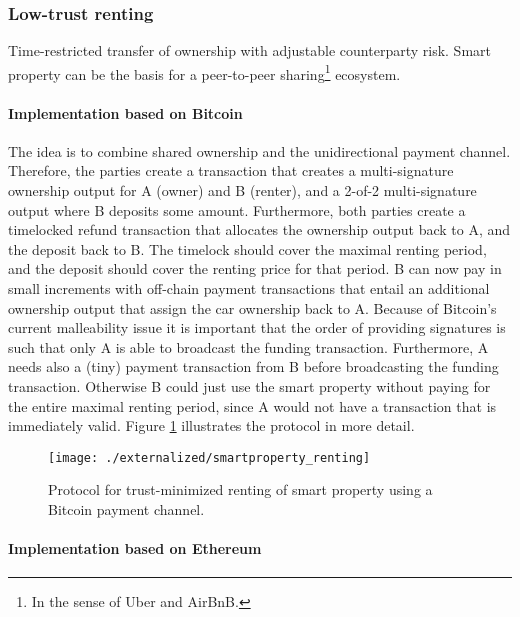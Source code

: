 \subsubsection{Low-trust renting}

Time-restricted transfer of ownership with adjustable counterparty risk. Smart property can be the basis for a peer-to-peer sharing\footnote{In the sense of Uber and AirBnB.} ecosystem. 

\paragraph{Implementation based on Bitcoin}

The idea is to combine shared ownership and the unidirectional payment channel. Therefore, the parties create a transaction that creates a multi-signature ownership output for A (owner) and B (renter), and a 2-of-2 multi-signature output where B deposits some amount. Furthermore, both parties create a timelocked refund transaction that allocates the ownership output back to A, and the deposit back to B. The timelock should cover the maximal renting period, and the deposit should cover the renting price for that period. B can now pay in small increments with off-chain payment transactions that entail an additional ownership output that assign the car ownership back to A. Because of Bitcoin's current malleability issue it is important that the order of providing signatures is such that only A is able to broadcast the funding transaction. Furthermore, A needs also a (tiny) payment transaction from B before broadcasting the funding transaction. Otherwise B could just use the smart property without paying for the entire maximal renting period, since A would not have a transaction that is immediately valid. Figure \ref{fig:smartproperty_renting} illustrates the protocol in more detail.

\begin{figure}[!t]
    \centering
    \texttt{[image: ./externalized/smartproperty\_renting]}
    \caption{Protocol for trust-minimized renting of smart property using a Bitcoin payment channel.}
    \label{fig:smartproperty_renting}
  \end{figure}

\paragraph{Implementation based on Ethereum}


